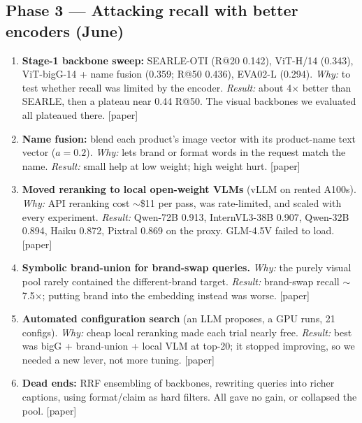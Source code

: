 \documentclass[11pt]{article}
\newcommand{\inpaper}{\textcolor{accent}{\small[paper]}}
\begin{document}
\subsection*{Phase 3 --- Attacking recall with better encoders (June)}
\begin{enumerate}[resume,leftmargin=*]
  \item \textbf{Stage-1 backbone sweep:} SEARLE-OTI (R@20 0.142), ViT-H/14 (0.343),
        ViT-bigG-14 + name fusion (0.359; R@50 0.436), EVA02-L (0.294). \emph{Why:} to test
        whether recall was limited by the encoder. \emph{Result:} about 4$\times$ better than
        SEARLE, then a plateau near 0.44 R@50. The visual backbones we evaluated all plateaued there.
        \inpaper
  \item \textbf{Name fusion:} blend each product's image vector with its product-name text
        vector ($a{=}0.2$). \emph{Why:} lets brand or format words in the request match the
        name. \emph{Result:} small help at low weight; high weight hurt. \inpaper
  \item \textbf{Moved reranking to local open-weight VLMs} (vLLM on rented A100s).
        \emph{Why:} API reranking cost $\sim$\$11 per pass, was rate-limited, and scaled with
        every experiment. \emph{Result:} Qwen-72B 0.913, InternVL3-38B 0.907, Qwen-32B 0.894,
        Haiku 0.872, Pixtral 0.869 on the proxy. GLM-4.5V failed to load. \inpaper
  \item \textbf{Symbolic brand-union for brand-swap queries.} \emph{Why:} the purely visual pool
        rarely contained the different-brand target.
        \emph{Result:} brand-swap recall $\sim$7.5$\times$; putting brand into the embedding
        instead was worse. \inpaper
  \item \textbf{Automated configuration search} (an LLM proposes, a GPU runs, 21 configs).
        \emph{Why:} cheap local reranking made each trial nearly free. \emph{Result:} best
        was bigG + brand-union + local VLM at top-20; it stopped improving, so we needed a
        new lever, not more tuning. \inpaper
  \item \textbf{Dead ends:} RRF ensembling of backbones, rewriting queries into richer
        captions, using format/claim as hard filters. All gave no gain, or collapsed the pool.
        \inpaper
\end{enumerate}
\end{document}
